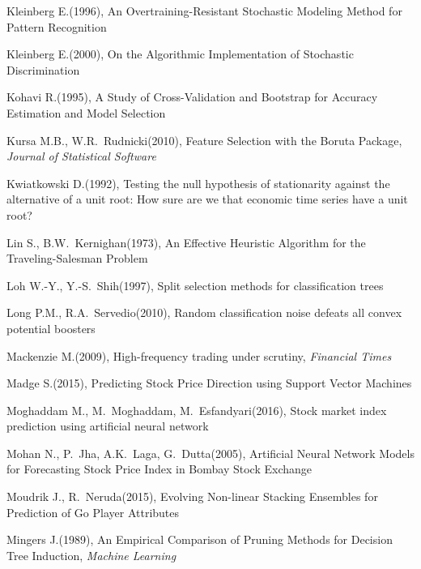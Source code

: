 \documentclass[12pt,a4paper,twoside,openany]{book}
\begin{document}
\begin{thebibliography}{99}
 Kleinberg E.(1996), An Overtraining-Resistant Stochastic Modeling Method for Pattern Recognition

 Kleinberg E.(2000), On the Algorithmic Implementation of Stochastic Discrimination

 Kohavi R.(1995), A Study of Cross-Validation and Bootstrap for Accuracy Estimation and Model Selection

 Kursa M.B., W.R.~Rudnicki(2010), Feature Selection with the Boruta Package, \textit{Journal of Statistical Software}

 Kwiatkowski D.(1992), Testing the null hypothesis of stationarity against the alternative of a unit root: How sure are we that economic time series have a unit root?

 Lin S., B.W.~Kernighan(1973), An Effective Heuristic Algorithm for the Traveling-Salesman Problem 

 Loh W.-Y., Y.-S.~Shih(1997), Split selection methods for classification trees

 Long P.M., R.A.~Servedio(2010), Random classification noise defeats all convex potential boosters

 Mackenzie M.(2009), High-frequency trading under scrutiny, \textit{Financial Times}

 Madge S.(2015), Predicting Stock Price Direction using Support Vector Machines 

 Moghaddam M., M.~Moghaddam, M.~Esfandyari(2016), Stock market index prediction using artificial neural network

 Mohan N., P.~Jha, A.K.~Laga, G.~Dutta(2005), Artificial Neural Network Models for Forecasting Stock Price Index in Bombay Stock Exchange

 Moudrik J., R.~Neruda(2015), Evolving Non-linear Stacking Ensembles for Prediction of Go Player Attributes

 Mingers J.(1989), An Empirical Comparison of Pruning Methods for Decision Tree Induction, \textit{Machine Learning}


\end{thebibliography}
\end{document}
